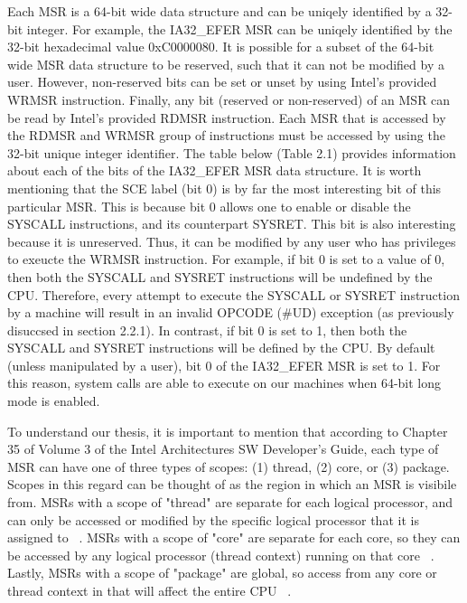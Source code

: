 \documentclass{report}
\begin{document}
\begin{spacing}{1.5}
{\large
\noindent Each MSR is a 64-bit wide data structure and can be uniqely identified by a 32-bit integer. For example, the IA32\_EFER MSR can be uniqely identified by the 32-bit hexadecimal value 0xC0000080. It is possible for a subset of the 64-bit wide MSR data structure to be reserved, such that it can not be modified by a user. However, non-reserved bits can be set or unset by using Intel's provided WRMSR instruction. Finally, any bit (reserved or non-reserved) of an MSR can be read by Intel's provided RDMSR instruction. Each MSR that is accessed by the RDMSR and WRMSR group of instructions must be accessed by using the 32-bit unique integer identifier. The table below (Table 2.1) provides information about each of the bits of the IA32\_EFER MSR data structure. It is worth mentioning that the SCE label (bit 0) is by far the most interesting bit of this particular MSR. This is because bit 0 allows one to enable or disable the SYSCALL instructions, and its counterpart SYSRET. This bit is also interesting because it is unreserved. Thus, it can be modified by any user who has privileges to exeucte the WRMSR instruction. For example, if bit 0 is set to a value of 0, then both the SYSCALL and SYSRET instructions will be undefined by the CPU. Therefore, every attempt to execute the SYSCALL or SYSRET instruction by a machine will result in an invalid OPCODE (\#UD) exception (as previously disuccsed in section 2.2.1). In contrast, if bit 0 is set to 1, then both the SYSCALL and SYSRET instructions will be defined by the CPU. By default (unless manipulated by a user), bit 0 of the IA32\_EFER MSR is set to 1. For this reason, system calls are able to execute on our machines when 64-bit long mode is enabled.
\newline
}


{\large
\noindent To understand our thesis, it is important to mention that according to Chapter 35 of Volume 3 of the Intel Architectures SW Developer's Guide, each type of MSR can have one of three types of scopes: (1) thread, (2) core, or (3) package. Scopes in this regard can be thought of as the region in which an MSR is visibile from. MSRs with a scope of "thread" are separate for each logical processor, and can only be accessed or modified by the specific logical processor that it is assigned to ~\cite{intelMSRManual}. MSRs with a scope of "core" are separate for each core, so they can be accessed by any logical processor (thread context) running on that core ~\cite{intelMSRManual}. Lastly, MSRs with a scope of "package" are global, so access from any core or thread context in that will affect the entire CPU ~\cite{intelMSRManual}.
\newline
}



\end{spacing}
\end{document}
